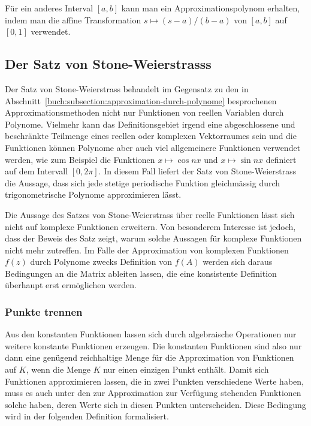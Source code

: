 Für ein anderes Interval $[a,b]$ kann man ein Approximationspolynom
erhalten, indem man die affine Transformation
$s\mapsto (s-a)/(b-a)$
von $[a,b]$ auf $[0,1]$
verwendet. 

%
%
\subsection{Der Satz von Stone-Weierstrasss
\label{buch:subsetion:stone-weierstrass}}
%
%
Der Satz von Stone-Weierstrass behandelt im Gegensatz zu den in
Abschnitt~\ref{buch:subsection:approximation-durch-polynome}
besprochenen Approximationsmethoden nicht nur Funktionen von
reellen Variablen durch Polynome.
Vielmehr kann das Definitionsgebiet irgend eine abgeschlossene
und beschränkte Teilmenge eines reellen oder komplexen Vektorraumes
sein und die Funktionen können Polynome aber auch viel allgemeinere
Funktionen verwendet werden, wie zum Beispiel die Funktionen
$x\mapsto \cos nx$ und $x\mapsto \sin nx$ definiert auf dem
Intervall $[0,2\pi]$.
In diesem Fall liefert der Satz von Stone-Weierstrass die Aussage,
dass sich jede stetige periodische Funktion gleichmässig durch
trigonometrische Polynome approximieren lässt.

Die Aussage des Satzes von Stone-Weierstrass über reelle Funktionen
lässt sich nicht auf komplexe Funktionen erweitern.
Von besonderem Interesse ist jedoch, dass der Beweis des Satz 
zeigt, warum solche Aussagen für komplexe Funktionen nicht mehr
zutreffen.
Im Falle der Approximation von komplexen Funktionen $f(z)$ durch Polynome
zwecks Definition von $f(A)$ werden sich daraus Bedingungen an die
Matrix ableiten lassen, die eine konsistente Definition überhaupt
erst ermöglichen werden.

\subsubsection{Punkte trennen}
Aus den konstanten Funktionen lassen sich durch algebraische
Operationen nur weitere konstante Funktionen erzeugen.
Die konstanten Funktionen sind also nur dann eine genügend
reichhaltige Menge für die Approximation von Funktionen auf $K$,
wenn die Menge $K$ nur einen einzigen Punkt enthält.
Damit sich Funktionen approximieren lassen, die in zwei Punkten
verschiedene Werte haben, muss es auch unter den zur Approximation
zur Verfügung stehenden Funktionen solche haben, deren Werte sich
in diesen Punkten unterscheiden.
Diese Bedingung wird in der folgenden Definition formalisiert.

